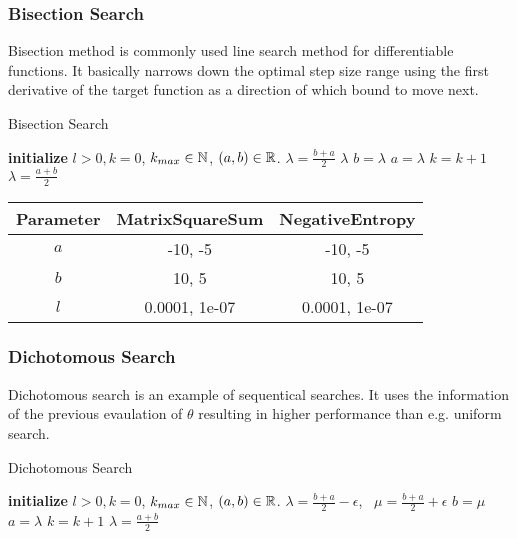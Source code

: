 \documentclass[a4paper,english,titlepage,12pt]{article}
\newcommand{\abs}[1]{\ensuremath|#1|}
\newcommand{\R}{\ensuremath\mathbb{R}}
\newcommand{\N}{\ensuremath\mathbb{N}}
\begin{document}
\subsubsection{Bisection Search}


Bisection method is  commonly used line search method for differentiable functions. It basically narrows down the optimal step size range using the first derivative of the target function as a direction of which bound to move next.

\begin{algorithm}[H]
\caption{Bisection Search}
\label{alg_bisection}
\begin{algorithmic}[1]
\STATE \textbf{initialize} $l > 0, k = 0$, $k_{max} \in \N$, $(a, b) \in \R$.
\WHILE{$\abs{b - a} > l$ \AND $k < k_{max}$}
    \STATE $\lambda = \frac{b + a}{2}$
        \RETURN $\lambda$
        \STATE $b = \lambda$
    \ELSE
        \STATE $a = \lambda$
    \ENDIF
    \STATE $k = k + 1$
\ENDWHILE
\RETURN $\lambda = \frac{a + b}{2}$
\end{algorithmic}
\end{algorithm}

\begin{center}
\label{tab:params_BisectionSearch}
\begin{tabular}{|c|c|c|}
\hline
\rowcolor{gray!25}
Parameter & MatrixSquareSum & NegativeEntropy \\
\hline
$a$ & -10, -5 & -10, -5 \\
$b$ & 10, 5 & 10, 5 \\
$l$ & 0.0001, 1e-07 & 0.0001, 1e-07 \\
\hline
\end{tabular}
\end{center}


\subsubsection{Dichotomous Search}


Dichotomous search is an example of sequentical searches. It uses the information of the previous evaulation of $\theta$ resulting in higher performance than e.g. uniform search.

\begin{algorithm}[H]
\caption{Dichotomous Search}
\label{alg_dichotomous}
\begin{algorithmic}[1]
\STATE \textbf{initialize} $l > 0, k = 0$, $k_{max} \in \N$, $(a, b) \in \R$.
    \STATE $\lambda = \frac{b + a}{2} - \epsilon$, \ $\mu = \frac{b + a}{2} + \epsilon$
    \IF{$\theta(\lambda) < \theta(\mu)$}
        \STATE $b = \mu$
    \ELSE
        \STATE $a = \lambda$
    \ENDIF
    \STATE $k = k + 1$
\ENDWHILE
\RETURN $\lambda = \frac{a + b}{2}$
\end{algorithmic}
\end{algorithm}
\end{document}
